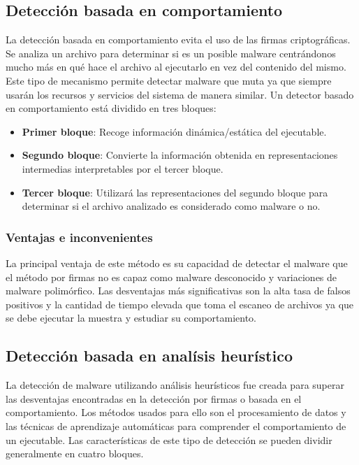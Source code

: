 \documentclass[12pt]{article}
\begin{document}
        \subsection{Detección basada en comportamiento}
            La detección basada en comportamiento evita el uso de las firmas criptográficas. Se analiza un archivo para determinar si es un posible malware centrándonos mucho más en qué hace el archivo al ejecutarlo en vez del contenido del mismo. Este tipo de mecanismo permite detectar malware que muta ya que siempre usarán los recursos y servicios del sistema de manera similar. Un detector basado en comportamiento está dividido en tres bloques:

            \begin{itemize}
                \item \textbf{Primer bloque}: Recoge información dinámica/estática del ejecutable.
                \item \textbf{Segundo bloque}: Convierte la información obtenida en representaciones intermedias interpretables por el tercer bloque.
                \item \textbf{Tercer bloque}: Utilizará las representaciones del segundo bloque para determinar si el archivo analizado es considerado como malware o no.
            \end{itemize}

            \subsubsection{Ventajas e inconvenientes}
                La principal ventaja de este método es su capacidad de detectar el malware que el método por firmas no es capaz como malware desconocido y variaciones de malware polimórfico. Las desventajas más significativas son la alta tasa de falsos positivos y la cantidad de tiempo elevada que toma el escaneo de archivos ya que se debe ejecutar la muestra y estudiar su comportamiento.

        \subsection{Detección basada en analísis heurístico}
            La detección de malware utilizando análisis heurísticos fue creada para superar las desventajas encontradas en la detección por firmas o basada en el comportamiento. Los métodos usados para ello son el procesamiento de datos y las técnicas de aprendizaje automáticas para comprender el comportamiento de un ejecutable. Las características de este tipo de detección se pueden dividir generalmente en cuatro bloques.
\end{document}
